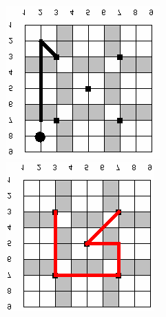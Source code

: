 \begin{anexos}
\begin{figure}[H]
	\begin{minipage}{0.5\linewidth}  %
		\centering
		\includegraphics[width=\linewidth]{passgo1.png} %
	\end{minipage}%
	\hfill
	\begin{minipage}{0.5\linewidth}  %
		\centering
		\includegraphics[width=\linewidth]{passgo2.png} %

\end{minipage}
\end{figure}
\end{anexos}
